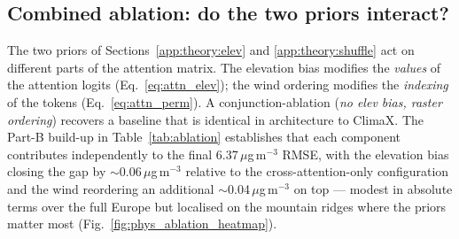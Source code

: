 \subsection{Combined ablation: do the two priors interact?}
\label{app:theory:joint}

The two priors of Sections~\ref{app:theory:elev} and
\ref{app:theory:shuffle} act on different parts of the attention
matrix. The elevation bias modifies the \emph{values} of the attention
logits (Eq.~\ref{eq:attn_elev}); the wind ordering modifies the
\emph{indexing} of the tokens (Eq.~\ref{eq:attn_perm}). A
conjunction-ablation (\textit{no elev bias, raster ordering}) recovers
a baseline that is identical in architecture to ClimaX. The Part-B
build-up in Table~\ref{tab:ablation} establishes that each component
contributes independently to the final 6.37\,$\mu$g\,m$^{-3}$ RMSE,
with the elevation bias closing the gap by
$\sim$0.06\,$\mu$g\,m$^{-3}$ relative to the cross-attention-only
configuration and the wind reordering an additional
$\sim$0.04\,$\mu$g\,m$^{-3}$ on top — modest in absolute terms over
the full Europe but localised on the mountain ridges where the priors
matter most (Fig.~\ref{fig:phys_ablation_heatmap}).
